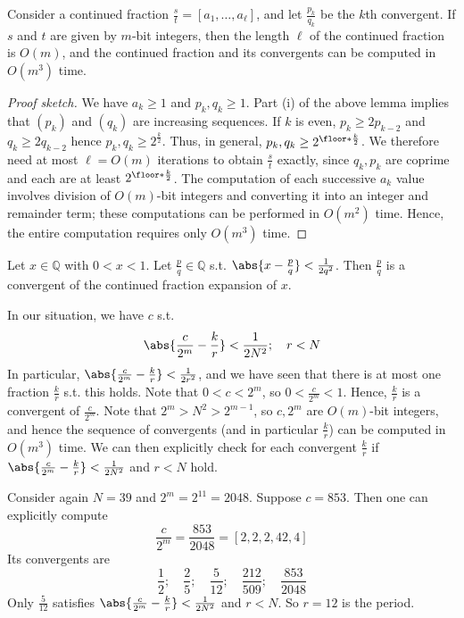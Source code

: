 \begin{theorem}
    Consider a continued fraction $\frac{s}{t} = [a_1, \dots, a_\ell]$, and let $\frac{p_k}{q_k}$ be the $k$th convergent.
    If $s$ and $t$ are given by $m$-bit integers, then the length $\ell$ of the continued fraction is $O(m)$, and the continued fraction and its convergents can be computed in $O(m^3)$ time.
\end{theorem}
\begin{proof}[Proof sketch]
    We have $a_k \geq 1$ and $p_k, q_k \geq 1$.
    Part (i) of the above lemma implies that $(p_k)$ and $(q_k)$ are increasing sequences.
    If $k$ is even, $p_k \geq 2p_{k-2}$ and $q_k \geq 2q_{k-2}$ hence $p_k, q_k \geq 2^{\frac{k}{2}}$.
    Thus, in general, $p_k, q_k \geq 2^{\floor*{\frac{k}{2}}}$.
    We therefore need at most $\ell = O(m)$ iterations to obtain $\frac{s}{t}$ exactly, since $q_k, p_k$ are coprime and each are at least $2^{\floor*{\frac{k}{2}}}$.
    The computation of each successive $a_k$ value involves division of $O(m)$-bit integers and converting it into an integer and remainder term; these computations can be performed in $O(m^2)$ time.
    Hence, the entire computation requires only $O(m^3)$ time.
\end{proof}
\begin{theorem}
    Let $x \in \mathbb Q$ with $0 < x < 1$.
    Let $\frac{p}{q} \in \mathbb Q$ s.t. $\abs{x - \frac{p}{q}} < \frac{1}{2q^2}$.
    Then $\frac{p}{q}$ is a convergent of the continued fraction expansion of $x$.
\end{theorem}
In our situation, we have $c$ s.t.
\[ \abs{\frac{c}{2^m} - \frac{k}{r}} < \frac{1}{2N^2};\quad r < N \]
In particular, $\abs{\frac{c}{2^m} - \frac{k}{r}} < \frac{1}{2r^2}$, and we have seen that there is at most one fraction $\frac{k}{r}$ s.t. this holds.
Note that $0 < c < 2^m$, so $0 < \frac{c}{2^m} < 1$.
Hence, $\frac{k}{r}$ is a convergent of $\frac{c}{2^m}$.
Note that $2^m > N^2 > 2^{m-1}$, so $c, 2^m$ are $O(m)$-bit integers, and hence the sequence of convergents (and in particular $\frac{k}{r}$) can be computed in $O(m^3)$ time.
We can then explicitly check for each convergent $\frac{k}{r}$ if $\abs{\frac{c}{2^m} - \frac{k}{r}} < \frac{1}{2N^2}$ and $r < N$ hold.
\begin{example}
    Consider again $N = 39$ and $2^m = 2^{11} = 2048$.
    Suppose $c = 853$.
    Then one can explicitly compute
    \[ \frac{c}{2^m} = \frac{853}{2048} = [2, 2, 2, 42, 4] \]
    Its convergents are
    \[ \frac{1}{2};\quad \frac{2}{5};\quad \frac{5}{12};\quad \frac{212}{509};\quad \frac{853}{2048} \]
    Only $\frac{5}{12}$ satisfies $\abs{\frac{c}{2^m} - \frac{k}{r}} < \frac{1}{2N^2}$ and $r < N$.
    So $r = 12$ is the period.
\end{example}
